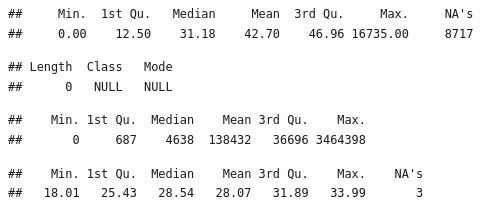 \documentclass[12pt,]{article}
\newenvironment{Shaded}{\begin{snugshade}}{\end{snugshade}}
\newcommand{\KeywordTok}[1]{\textcolor[rgb]{0.13,0.29,0.53}{\textbf{#1}}}
\newcommand{\OperatorTok}[1]{\textcolor[rgb]{0.81,0.36,0.00}{\textbf{#1}}}
\newcommand{\NormalTok}[1]{#1}
\begin{document}
\begin{Shaded}
\end{Shaded}

\begin{verbatim}
##     Min.  1st Qu.   Median     Mean  3rd Qu.     Max.     NA's 
##     0.00    12.50    31.18    42.70    46.96 16735.00     8717
\end{verbatim}

\begin{Shaded}
\end{Shaded}

\begin{verbatim}
## Length  Class   Mode 
##      0   NULL   NULL
\end{verbatim}

\begin{Shaded}
\end{Shaded}

\begin{verbatim}
##    Min. 1st Qu.  Median    Mean 3rd Qu.    Max. 
##       0     687    4638  138432   36696 3464398
\end{verbatim}

\begin{Shaded}
\end{Shaded}

\begin{verbatim}
##    Min. 1st Qu.  Median    Mean 3rd Qu.    Max.    NA's 
##   18.01   25.43   28.54   28.07   31.89   33.99       3
\end{verbatim}

\begin{Shaded}
\end{Shaded}
\end{document}

